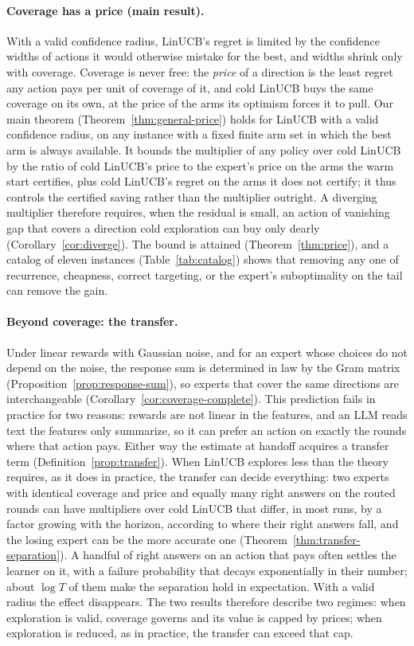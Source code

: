 \documentclass{article}
\theoremstyle{definition}
\theoremstyle{remark}
\theoremstyle{remark}
\begin{document}
\paragraph{Coverage has a price (main result).}
With a valid confidence radius, LinUCB's regret is limited by the confidence
widths of actions it would otherwise mistake for the best, and widths shrink
only with coverage.
Coverage is never free: the \emph{price} of a direction is the least regret
any action pays per unit of coverage of it, and cold LinUCB buys the same
coverage on its own, at the price of the arms its optimism forces it to pull.
Our main theorem (Theorem~\ref{thm:general-price}) holds for LinUCB with a
valid confidence radius, on any instance with a fixed finite arm set in which
the best arm is always available. It bounds the multiplier of any policy over
cold LinUCB by the ratio of cold LinUCB's price to the expert's price on the
arms the warm start certifies, plus cold LinUCB's regret on the arms it does
not certify; it thus controls the certified saving rather than the
multiplier outright. A diverging multiplier
therefore requires, when the residual is small, an action of vanishing gap
that covers a direction cold exploration can buy only dearly
(Corollary~\ref{cor:diverge}). The bound is
attained (Theorem~\ref{thm:price}), and a catalog of eleven instances
(Table~\ref{tab:catalog}) shows that removing any one of recurrence,
cheapness, correct targeting, or the expert's suboptimality on the tail can
remove the gain.

\paragraph{Beyond coverage: the transfer.}
Under linear rewards with Gaussian noise, and for an expert whose choices do
not depend on the noise, the response sum is determined in law by the Gram matrix
(Proposition~\ref{prop:response-sum}), so experts that cover the same
directions are interchangeable (Corollary~\ref{cor:coverage-complete}). This
prediction fails in practice for two reasons: rewards are not linear in the
features, and an LLM reads text the features only summarize, so it can prefer
an action on exactly the rounds where that action pays. Either way the
estimate at handoff acquires a transfer term (Definition~\ref{prop:transfer}).
When LinUCB explores less than the theory requires, as it does in practice,
the transfer can decide everything: two experts with identical coverage and
price and equally many right answers on the routed rounds can have
multipliers over cold LinUCB that differ, in most runs, by a factor growing
with the horizon, according to where their right answers fall, and the
losing expert can be the more accurate one
(Theorem~\ref{thm:transfer-separation}). A handful of right answers on an
action that pays often settles the learner on it, with a failure probability
that decays exponentially in their number; about $\log T$ of them make the
separation hold in expectation. With a valid radius the effect disappears. The
two results therefore describe two regimes: when exploration is valid,
coverage governs and its value is capped by prices; when exploration is
reduced, as in practice, the transfer can exceed that cap.
\end{document}
